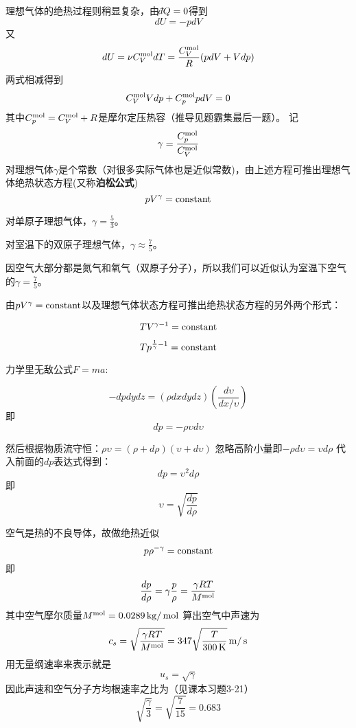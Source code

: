 \documentclass[CJK]{beamer}
\begin{document}
\begin{frame}
\bch
{\small
理想气体的绝热过程则稍显复杂，由$\dbar Q=0$得到
$$ dU = -p dV$$
又$$ dU = \nu C_V^{\rm mol} dT = \frac{C_V^{\rm mol}}{R}(p dV + V dp)$$
两式相减得到
$$ C_V^{\rm mol} Vdp + C_p^{\rm mol} p dV = 0$$
其中$C_p^{\rm mol} = C_V^{\rm mol} + R$是摩尔定压热容（推导见题霸集最后一题）。
记$$\gamma = \frac{C_p^{\rm mol}}{C_V^{\rm mol}}$$
对理想气体$\gamma$是个常数（对很多实际气体也是近似常数)，由上述方程可推出{\blue 理想气体绝热状态方程}(又称{\bf 泊松公式})
{\blue 
$$p V^\gamma = \mathrm{constant}$$}
}
\ech
\end{frame}


\begin{frame}
\bch
{\small
对单原子理想气体，$\gamma = \frac{5}{3}$。

\skipline

对室温下的双原子理想气体，$\gamma \approx \frac{7}{5}$。

\skipline

因空气大部分都是氮气和氧气（双原子分子），所以我们可以近似认为室温下空气的$\gamma = \frac{7}{5}$。
}

由$pV^\gamma = \mathrm{constant} $以及理想气体状态方程可推出绝热状态方程的另外两个形式：

$$ TV^{\gamma-1} = \mathrm{constant}$$

$$T p^{\frac{1}{\gamma}-1} = \mathrm{constant} $$
\ech
\end{frame}

\begin{frame}
\bch
{}

{\scriptsize
力学里无敌公式$F = ma$:

$$ -dp dy dz = (\rho dx dy dz) \left(\frac{d\upsilon}{dx/\upsilon}\right) $$
即
$$ dp = - \rho \upsilon d\upsilon $$

然后根据物质流守恒：$ \rho \upsilon = (\rho + d\rho)(\upsilon+d\upsilon)$
忽略高阶小量即$ -\rho d\upsilon = \upsilon d\rho$
代入前面的$dp$表达式得到：
$$ dp = \upsilon ^2 d\rho$$
即
$$\upsilon = \sqrt{\frac{dp}{d\rho}}$$
}
\ech
\end{frame}

\begin{frame}
\bch
{\small
空气是热的不良导体，故做绝热近似 
$$p\rho^{-\gamma} = \mathrm{constant}$$
即 $$\frac{dp}{d\rho} = \gamma \frac{p}{\rho} =  \frac{\gamma R T}{M^{\rm mol}}$$
其中空气摩尔质量$M^{\rm mol} = 0.0289 \,\mathrm{kg}/\,\mathrm{mol}$
算出空气中声速为
$$c_s = \sqrt{\frac{\gamma RT}{M^{\rm mol}}} = 347 \sqrt{\frac{T}{300\,\mathrm{K}}} \,\mathrm{m}/\,\mathrm{s}$$
用无量纲速率来表示就是
$$u_s = \sqrt{\gamma}$$
因此声速和空气分子方均根速率之比为（见课本习题3-21）
$$\sqrt{\frac{\gamma}{3}} = \sqrt{\frac{7}{15}} = 0.683$$
}
\ech
\end{frame}
\end{document}

